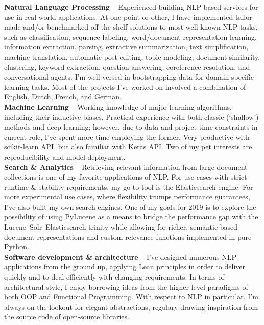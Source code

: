 \documentclass[9pt]{developercv} %
\begin{document}
\textbf{Natural Language Processing} -- Experienced building NLP-based services
for use in real-world applications. At one point or other, I have implemented
tailor-made and/or benchmarked off-the-shelf solutions to most well-known NLP
tasks, such as classification, sequence labeling, word/document representation
learning, information extraction, parsing, extractive summarization, text
simplification, machine translation, automatic post-editing, topic modeling,
document similarity, clustering, keyword extraction, question answering,
coreference resolution, and conversational agents. I'm well-versed in
bootstrapping data for domain-specific learning tasks. Most of the projects
I've worked on involved a combination of English, Dutch, French, and German.\\ 

\textbf{Machine Learning} -- Working knowledge of major learning algorithms,
including their inductive biases. Practical experience with both classic
(`shallow') methods and deep learning; however, due to data and project time
constraints in current role, I've spent more time employing the former. Very
productive with scikit-learn API, but also familiar with Keras API. Two of my
pet interests are reproducibility and model deployment.\\

\textbf{Search \& Analytics} -- Retrieving relevant information from large
document collections is one of my favorite applications of NLP. For use cases
with strict runtime \& stability requirements, my go-to tool is the
Elasticsearch engine. For more experimental use cases, where flexibility trumps
performance guarantees, I've also built my own search engines. One of my goals
for 2019 is to explore the possibility of using PyLucene as a means to bridge
the performance gap with the Lucene--Solr--Elasticsearch trinity while allowing
for richer, semantic-based document representations and custom relevance
functions implemented in pure Python.\\

\textbf{Software development \& architecture} -- I've designed numerous NLP
applications from the ground up, applying Lean principles in order to deliver
quickly and to deal efficiently with changing requirements. In terms of
architectural style, I enjoy borrowing ideas from the higher-level paradigms of
both OOP and Functional Programming. With respect to NLP in particular, I'm
always on the lookout for elegant abstractions, regulary drawing
inspiration from the source code of open-source libraries.\\
\end{document}
